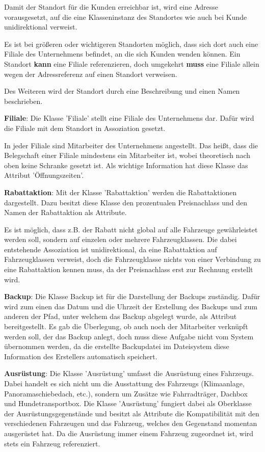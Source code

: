 Damit der Standort für die Kunden erreichbar ist, wird eine Adresse vorausgesetzt, auf die eine Klasseninstanz des Standortes wie auch bei Kunde unidirektional verweist. 

Es ist bei größeren oder wichtigeren Standorten möglich, dass sich dort auch eine Filiale des Unternehmens befindet, an die sich Kunden wenden können. Ein Standort \textbf{kann} eine Filiale referenzieren, doch umgekehrt \textbf{muss} eine Filiale allein wegen der Adressreferenz auf einen Standort verweisen.

Des Weiteren wird der Standort durch eine Beschreibung und einen Namen beschrieben. 

\textbf{Filiale}: Die Klasse 'Filiale' stellt eine Filiale des Unternehmens dar. Dafür wird die Filiale mit dem Standort in Assoziation gesetzt.

In jeder Filiale sind Mitarbeiter des Unternehmens angestellt. Das heißt, dass die Belegschaft einer Filiale mindestens ein Mitarbeiter ist, wobei theoretisch nach oben keine Schranke gesetzt ist. Als wichtige Information hat diese Klasse das Attribut 'Öffnungszeiten'. 

\textbf{Rabattaktion}: Mit der Klasse 'Rabattaktion' werden die Rabattaktionen dargestellt. Dazu besitzt diese Klasse den prozentualen Preisnachlass und den Namen der Rabattaktion als Attribute. 

Es ist möglich, dass z.B. der Rabatt nicht global auf alle Fahrzeuge gewährleistet werden soll, sondern auf einzelen oder mehrere Fahrzeugklassen. Die dabei entstehende Assoziation ist unidirektional, da eine Rabattaktion auf Fahrzeugklassen verweist, doch die Fahrzeugklasse nichts von einer Verbindung zu eine Rabattaktion kennen muss, da der Preisnachlass erst zur Rechnung erstellt wird. 

\textbf{Backup}: Die Klasse Backup ist für die Darstellung der Backups zuständig. Dafür wird zum einen das Datum und die Uhrzeit der Erstellung des Backups und zum anderen der Pfad, unter welchem das Backup abgelegt wurde, als Attribut bereitgestellt. Es gab die Überlegung, ob auch noch der Mitarbeiter verknüpft werden soll, der das Backup anlegt, doch muss diese Aufgabe nicht vom System übernommen werden, da die erstellte Backupdatei im Dateisystem diese Information des Erstellers automatisch speichert. 

\textbf{Ausrüstung}: Die Klasse 'Ausrüstung' umfasst die Ausrüstung eines Fahrzeugs. Dabei handelt es sich nicht um die Ausstattung des Fahrzeugs (Klimaanlage, Panoramaschiebedach, etc.), sondern um Zusätze wie Fahrradträger, Dachbox und Hundetransportbox. Die Klasse 'Ausrüstung' fungiert dabei als Oberklasse der Ausrüstungsgegenstände und besitzt als Attribute die Kompatibilität mit den verschiedenen Fahrzeugen und das Fahrzeug, welches den Gegenstand momentan ausgerüstet hat. Da die Ausrüstung immer einem Fahrzeug zugeordnet ist, wird stets ein Fahrzeug referenziert.


